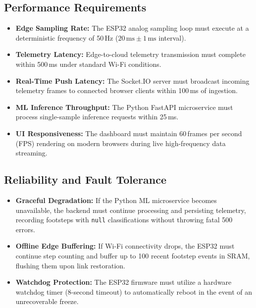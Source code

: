 \subsection{Performance Requirements}
\begin{itemize}
    \item \textbf{Edge Sampling Rate:} The ESP32 analog sampling loop must execute at a deterministic frequency of 50\,Hz ($20\,\text{ms} \pm 1\,\text{ms}$ interval).
    \item \textbf{Telemetry Latency:} Edge-to-cloud telemetry transmission must complete within 500\,ms under standard Wi-Fi conditions.
    \item \textbf{Real-Time Push Latency:} The Socket.IO server must broadcast incoming telemetry frames to connected browser clients within 100\,ms of ingestion.
    \item \textbf{ML Inference Throughput:} The Python FastAPI microservice must process single-sample inference requests within 25\,ms.
    \item \textbf{UI Responsiveness:} The dashboard must maintain 60\,frames per second (FPS) rendering on modern browsers during live high-frequency data streaming.
\end{itemize}

\subsection{Reliability and Fault Tolerance}
\begin{itemize}
    \item \textbf{Graceful Degradation:} If the Python ML microservice becomes unavailable, the backend must continue processing and persisting telemetry, recording footsteps with \texttt{null} classifications without throwing fatal 500 errors.
    \item \textbf{Offline Edge Buffering:} If Wi-Fi connectivity drops, the ESP32 must continue step counting and buffer up to 100 recent footstep events in SRAM, flushing them upon link restoration.
    \item \textbf{Watchdog Protection:} The ESP32 firmware must utilize a hardware watchdog timer (8-second timeout) to automatically reboot in the event of an unrecoverable freeze.
\end{itemize}

